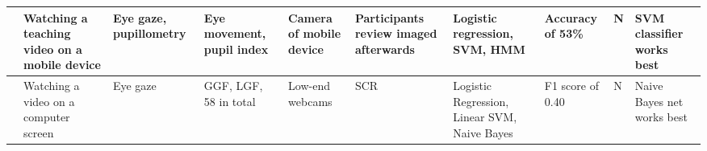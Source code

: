 \begin{landscape}
\begin{xtabular}{p{25mm}p{25mm}p{30mm}p{18mm}p{32mm}p{22mm}p{2cm}p{2cm}p{15mm}p{32cm}}
\cite{ISI:000443429900018} & Watching a teaching video on a mobile device & Eye gaze, pupillometry & Eye movement, pupil index & Camera of mobile device & Participants review imaged afterwards & Logistic regression, SVM, HMM & Accuracy of 53\% & N & SVM classifier works best\\ \midrule 
\cite{Zhao2017ScalableApproach} & Watching a video on a computer screen & Eye gaze & GGF, LGF, 58 in total & Low-end webcams & SCR & Logistic Regression, Linear SVM, Naive Bayes & F1 score of 0.40 & N & Naive Bayes net works best\\ \midrule
\bottomrule
\end{xtabular}
\end{landscape}
\restoregeometry
\twocolumn